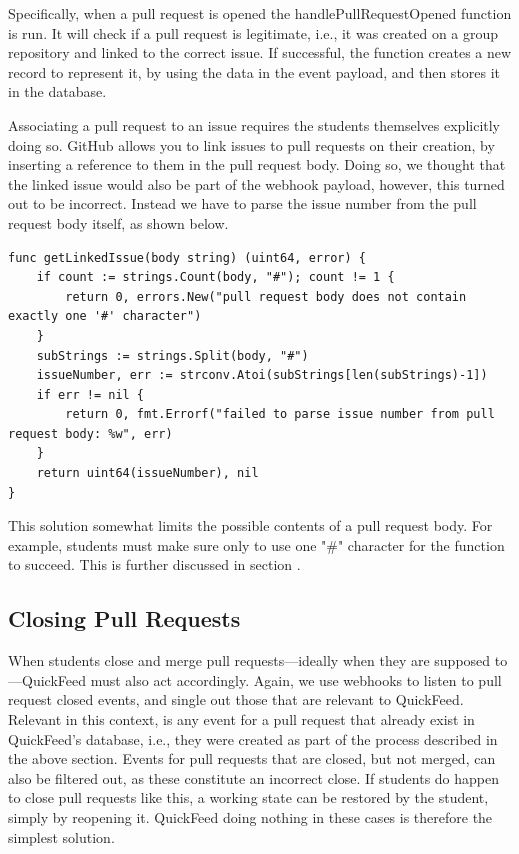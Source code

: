 Specifically, when a pull request is opened the handlePullRequestOpened function is run.
It will check if a pull request is legitimate, i.e., it was created on a group repository and linked to the correct issue.
If successful, the function creates a new record to represent it, by using the data in the event payload, and then stores it in the database.

Associating a pull request to an issue requires the students themselves explicitly doing so.
GitHub allows you to link issues to pull requests on their creation, by inserting a reference to them in the pull request body.
Doing so, we thought that the linked issue would also be part of the webhook payload, however, this turned out to be incorrect.
Instead we have to parse the issue number from the pull request body itself, as shown below.

\begin{lstlisting}[caption={The getLinkedIssue function}, language=Golang, label={code:getLinkedIssue}]
func getLinkedIssue(body string) (uint64, error) {
	if count := strings.Count(body, "#"); count != 1 {
		return 0, errors.New("pull request body does not contain exactly one '#' character")
	}
	subStrings := strings.Split(body, "#")
	issueNumber, err := strconv.Atoi(subStrings[len(subStrings)-1])
	if err != nil {
		return 0, fmt.Errorf("failed to parse issue number from pull request body: %w", err)
	}
	return uint64(issueNumber), nil
}
\end{lstlisting}

This solution somewhat limits the possible contents of a pull request body.
For example, students must make sure only to use one "\#" character for the function to succeed.
This is further discussed in section .%

\subsection{Closing Pull Requests}

When students close and merge pull requests---ideally when they are supposed to---QuickFeed must also act accordingly.
Again, we use webhooks to listen to pull request closed events, and single out those that are relevant to QuickFeed.
Relevant in this context, is any event for a pull request that already exist in QuickFeed's database, i.e., they were created as part of the process described in the above section.
Events for pull requests that are closed, but not merged, can also be filtered out, as these constitute an incorrect close.
If students do happen to close pull requests like this, a working state can be restored by the student, simply by reopening it.
QuickFeed doing nothing in these cases is therefore the simplest solution.


